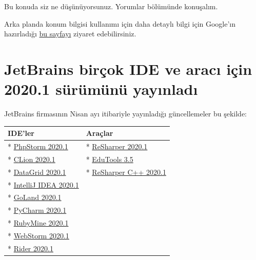 \documentclass[11pt]{article}
\begin{document}
Bu konuda siz ne düşünüyorsunuz. Yorumlar bölümünde konuşalım.

Arka planda konum bilgisi kullanımı için daha detaylı bilgi için Google'ın
hazırladığı \href{https://support.google.com/googleplay/android-developer/answer/9799150}{bu sayfayı} ziyaret edebilirsiniz.
\section{JetBrains birçok IDE ve aracı için 2020.1 sürümünü yayınladı}
\label{sec:org50996f0}
JetBrains firmasının Nisan ayı itibariyle yayınladığı güncellemeler bu
şekilde:

\begin{center}
\begin{tabular}{ll}
\hline
IDE'ler & Araçlar\\
\hline
* \href{https://blog.jetbrains.com/phpstorm/2020/04/phpstorm-2020-1-release/}{PhpStorm 2020.1} & * \href{https://www.jetbrains.com/resharper/whatsnew/}{ReSharper 2020.1}\\
* \href{https://www.jetbrains.com/clion/whatsnew/}{CLion 2020.1} & * \href{https://blog.jetbrains.com/blog/2020/04/16/edutools-v-3-6/}{EduTools 3.5}\\
* \href{https://www.jetbrains.com/datagrip/whatsnew/}{DataGrid 2020.1} & * \href{https://www.jetbrains.com/resharper-cpp/whatsnew/?mkt\_tok=eyJpIjoiTUdRME9EQXhNMlppTWpKayIsInQiOiJiNGZFR2toVHl1ZDdWS3pMVUFcL1lOUkZiUUxtR2U3Wk9yRmVrWlp1SlVMS3VLd1FHUlpaVVdZV1k2RXBqSGF4NXVhQ1RhOERNVTA5UVFhb1U2SCsrZHgwMGdIc29KdVwvOUZVMzRPYTNTMUoxdWFOT3Q2eUN0M2Y5RmJFOHdHTXJTIn0\%253D}{ReSharper C++ 2020.1}\\
* \href{https://www.jetbrains.com/idea/whatsnew/}{IntelliJ IDEA 2020.1} & \\
* \href{https://www.jetbrains.com/go/whatsnew/}{GoLand 2020.1} & \\
* \href{https://www.jetbrains.com/pycharm/whatsnew/}{PyCharm 2020.1} & \\
* \href{https://www.jetbrains.com/ruby/whatsnew/}{RubyMine 2020.1} & \\
* \href{https://www.jetbrains.com/webstorm/whatsnew/}{WebStorm 2020.1} & \\
* \href{https://www.jetbrains.com/rider/whatsnew/}{Rider 2020.1} & \\
\hline
\end{tabular}
\end{center}
\end{document}
